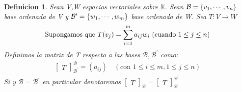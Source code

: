 \documentclass[]{article}
\newtheorem{definition}{Definicion}
\newcommand{\K}{
    \mathbb{K}
}
\newcommand{\base}{\text{$\mathcal{B}$}}
\newcommand{\basep}{\text{$\mathcal{B}^{\prime}$}}
\begin{document}
\begin{definition}
    Sean V,W espacios vectoriales sobre $\K$. Sean $\base=\conjunto{\vc{1},\cdots,\vc{n}}$ base ordenada de V y
    $\basep=\conjunto{\wc{1},\cdots,\wc{m}}$ base ordenada de W. Sea $T:V\rightarrow W$ \tl
    \begin{align*}
        \text{Supongamos que } T(\text{$v_{j}$})=\sum_{i=1}^{m} a_{ij}\text{$w_{i}$} \text{ (cuando $1 \leq j \leq n$)}
    \end{align*}
    Definimos la matriz de T respecto a las bases $\base , \basep$ como:
    \begin{align*}
        \begin{bmatrix} T \end{bmatrix}_{\basep}^{\base}=(a_{ij}) \quad (\text{con }1\leq i\leq m,1\leq j\leq n)
    \end{align*}
    Si  y $\base=\basep$ en particular denotaremos
    $\begin{bmatrix} T \end{bmatrix}_{\base} =\begin{bmatrix} T \end{bmatrix}_{\base}^{\basep}$

\end{definition}
\end{document}
